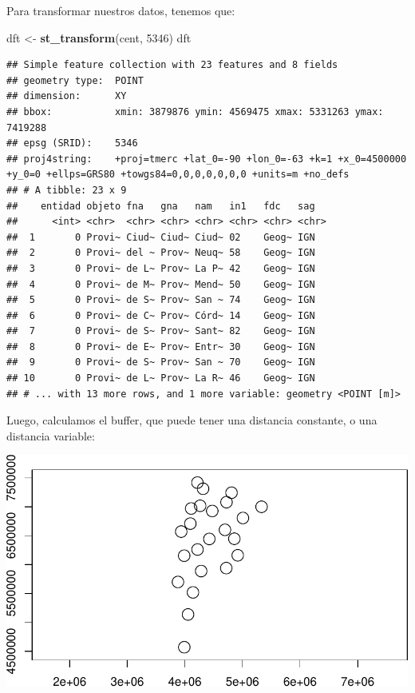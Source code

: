 \documentclass[]{book}
\newenvironment{Shaded}{\begin{snugshade}}{\end{snugshade}}
\newcommand{\CommentTok}[1]{\textcolor[rgb]{0.56,0.35,0.01}{\textit{#1}}}
\newcommand{\DataTypeTok}[1]{\textcolor[rgb]{0.13,0.29,0.53}{#1}}
\newcommand{\DecValTok}[1]{\textcolor[rgb]{0.00,0.00,0.81}{#1}}
\newcommand{\KeywordTok}[1]{\textcolor[rgb]{0.13,0.29,0.53}{\textbf{#1}}}
\newcommand{\NormalTok}[1]{#1}
\newcommand{\OperatorTok}[1]{\textcolor[rgb]{0.81,0.36,0.00}{\textbf{#1}}}
\newcommand{\StringTok}[1]{\textcolor[rgb]{0.31,0.60,0.02}{#1}}
\begin{document}
Para transformar nuestros datos, tenemos que:

\begin{Shaded}
\begin{Highlighting}[]
\NormalTok{dft <-}\StringTok{ }\KeywordTok{st_transform}\NormalTok{(cent, }\DecValTok{5346}\NormalTok{)}
\NormalTok{dft}
\end{Highlighting}
\end{Shaded}

\begin{verbatim}
## Simple feature collection with 23 features and 8 fields
## geometry type:  POINT
## dimension:      XY
## bbox:           xmin: 3879876 ymin: 4569475 xmax: 5331263 ymax: 7419288
## epsg (SRID):    5346
## proj4string:    +proj=tmerc +lat_0=-90 +lon_0=-63 +k=1 +x_0=4500000 +y_0=0 +ellps=GRS80 +towgs84=0,0,0,0,0,0,0 +units=m +no_defs
## # A tibble: 23 x 9
##    entidad objeto fna   gna   nam   in1   fdc   sag  
##      <int> <chr>  <chr> <chr> <chr> <chr> <chr> <chr>
##  1       0 Provi~ Ciud~ Ciud~ Ciud~ 02    Geog~ IGN  
##  2       0 Provi~ del ~ Prov~ Neuq~ 58    Geog~ IGN  
##  3       0 Provi~ de L~ Prov~ La P~ 42    Geog~ IGN  
##  4       0 Provi~ de M~ Prov~ Mend~ 50    Geog~ IGN  
##  5       0 Provi~ de S~ Prov~ San ~ 74    Geog~ IGN  
##  6       0 Provi~ de C~ Prov~ Córd~ 14    Geog~ IGN  
##  7       0 Provi~ de S~ Prov~ Sant~ 82    Geog~ IGN  
##  8       0 Provi~ de E~ Prov~ Entr~ 30    Geog~ IGN  
##  9       0 Provi~ de S~ Prov~ San ~ 70    Geog~ IGN  
## 10       0 Provi~ de L~ Prov~ La R~ 46    Geog~ IGN  
## # ... with 13 more rows, and 1 more variable: geometry <POINT [m]>
\end{verbatim}

Luego, calculamos el buffer, que puede tener una distancia constante, o una distancia variable:

\begin{Shaded}
\end{Shaded}

\includegraphics{bookdown-demo_files/figure-latex/unnamed-chunk-53-1.pdf}
\end{document}
